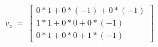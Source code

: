 \documentclass[preview]{standalone}
\begin{document}
\begin{align*}
v_z\ =\ \begin{bmatrix}
                        0*1+0*(-1)+0*(-1)\\
                        1*1+0*0+0*(-1)\\
                        0*1+0*0+1*(-1)
                        \end{bmatrix}
\end{align*}
\end{document}
